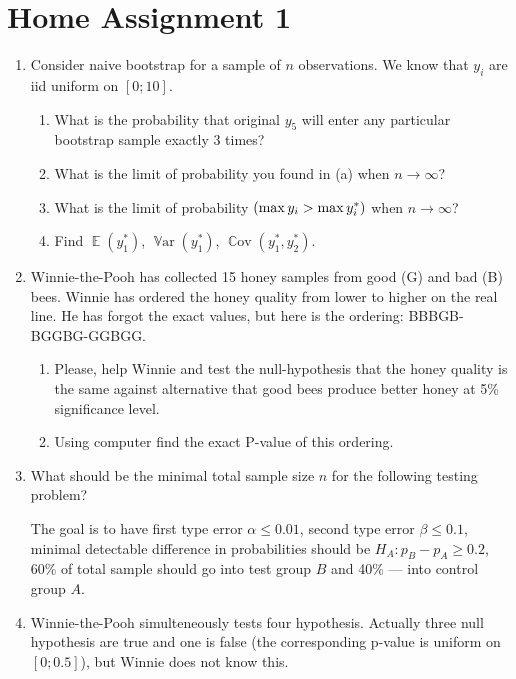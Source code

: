 \documentclass[12pt]{article}
\DeclareMathOperator{\Cov}{\mathbb{C}ov}
\DeclareMathOperator{\Var}{\mathbb{V}ar}
\let\P\relax
\DeclareMathOperator{\P}{\mathbb{P}}
\DeclareMathOperator{\E}{\mathbb{E}}
\begin{document}
\section*{Home Assignment 1}
\begin{enumerate}

  \item Consider naive bootstrap for a sample of $n$ observations. We know that $y_i$ are iid uniform on $[0;10]$.
  \begin{enumerate}
    \item What is the probability that original $y_5$ will enter any particular bootstrap sample exactly $3$ times?
    \item What is the limit of probability you found in (a) when $n\to\infty$?
    \item What is the limit of probability $\P(\max y_i > \max y_i^*)$ when $n\to\infty$?
    \item Find $\E(y_1^*)$, $\Var(y_1^*)$, $\Cov(y_1^*, y_2^*)$.
  \end{enumerate}

  \item Winnie-the-Pooh has collected 15 honey samples from good (G) and bad (B) bees. 
  Winnie has ordered the honey quality from lower to higher on the real line.
  He has forgot the exact values, but here is the ordering: BBBGB-BGGBG-GGBGG.

  \begin{enumerate}
    \item Please, help Winnie and test the null-hypothesis that the honey quality is the same 
    against alternative that good bees produce better honey at 5\% significance level.
    \item Using computer find the exact P-value of this ordering.
  \end{enumerate}
  
  \item What should be the minimal total sample size $n$ for the following testing problem?
  
  The goal is to have first type error $\alpha \leq 0.01$, second type error $\beta \leq 0.1$,
  minimal detectable difference in probabilities should be $H_A: p_B - p_A \geq 0.2$, 60\% of 
  total sample should go into test group $B$ and 40\% — into control group $A$.
  
  \item Winnie-the-Pooh simulteneously tests four hypothesis. 
  Actually three null hypothesis are true and one is false (the corresponding p-value is uniform on $[0;0.5]$),
  but Winnie does not know this. 
  


\end{enumerate}
\end{document}

